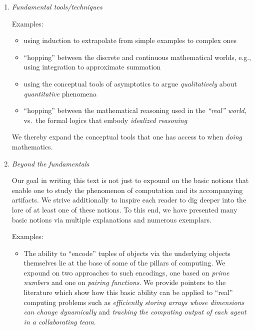 \begin{enumerate}
\medskip

\item
{\it Fundamental tools/techniques}

\medskip

{\small\sf Examples:}
\begin{itemize}
\item
using induction to extrapolate from simple examples to complex ones
\item
``hopping'' between the discrete and continuous mathematical worlds, e.g., using integration to approximate summation
\item
using the conceptual tools of asymptotics to argue {\em qualitatively} about {\em quantitative} phenomena
\item
``hopping'' between the mathematical reasoning used in the {\em ``real'' world}, vs.~the formal logics that embody {\em idealized reasoning}
\end{itemize}
We thereby expand the conceptual tools that one has access to when {\em doing} mathematics.

\medskip

\item
{\it Beyond the fundamentals}

Our goal in writing this text is not just to expound on the basic notions that enable one to study the phenomenon of computation and its accompanying artifacts.  We strive additionally to inspire each reader to dig deeper into the lore of at least one of these notions.  To this end, we have presented many basic notions via multiple explanations and numerous exemplars.

\medskip

{\small\sf Examples:}
\begin{itemize}
\item
The ability to ``encode'' tuples of objects via the underlying objects themselves lie at the base of some of the pillars of computing.  We expound on two approaches to such encodings, one based on {\em prime numbers} and one on {\em pairing functions}.  We provide pointers to the literature which show how this basic ability can be applied to ``real'' computing problems such as {\em efficiently storing arrays whose dimensions can change dynamically} and {\em tracking the  computing output of each agent in a collaborating team}.


\end{itemize}
\end{enumerate}
